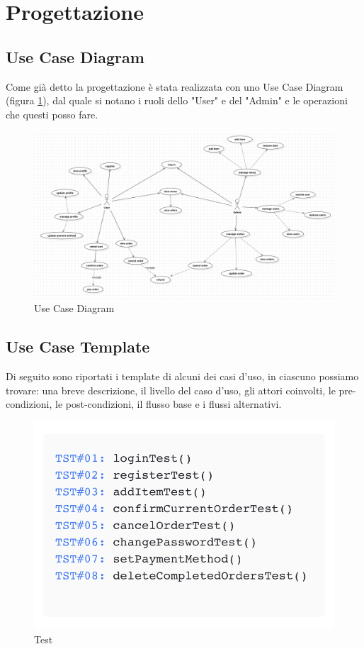 \documentclass{article}
\begin{document}
\section{Progettazione}

\subsection{Use Case Diagram}
Come già detto la progettazione è stata realizzata con uno Use Case Diagram (figura \ref{useCaseDiagram}), dal quale si notano i ruoli dello "User" e del "Admin" e le operazioni che questi posso fare.

\begin{figure}[h]
    \includegraphics[width=1.0\textwidth]{imgs/UseCaseDiagram.png}
    \caption{Use Case Diagram}
    \label{useCaseDiagram}
\end{figure}

\clearpage

\subsection{Use Case Template} \label{subsec:use-case-template}
    Di seguito sono riportati i template di alcuni dei casi d'uso, in ciascuno possiamo trovare: una breve descrizione,
    il livello del caso d'uso, gli attori coinvolti, le pre-condizioni, le post-condizioni, il flusso base e i flussi alternativi. \\

\begin{figure}[!h]
    \centering
    \includegraphics[width=0.7\linewidth]{imgs/Test.png}
    \caption{Test}
    \label{Test}
\end{figure}
\end{document}
